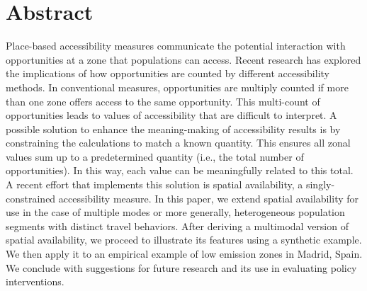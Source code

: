 \documentclass[10pt,letterpaper]{article}
\newcommand{\getIndex}[2]{
  \ForEach{,}{\IfEq{#1}{\thislevelitem}{\number\thislevelcount\ExitForEach}{}}{#2}
}
\newcommand{\getAff}[1]{
  \getIndex{#1}{McMaster,Madrid}
}
\begin{document}
\vspace*{0.2in}


\section*{Abstract}
Place-based accessibility measures communicate the potential interaction
with opportunities at a zone that populations can access. Recent
research has explored the implications of how opportunities are counted
by different accessibility methods. In conventional measures,
opportunities are multiply counted if more than one zone offers access
to the same opportunity. This multi-count of opportunities leads to
values of accessibility that are difficult to interpret. A possible
solution to enhance the meaning-making of accessibility results is by
constraining the calculations to match a known quantity. This ensures
all zonal values sum up to a predetermined quantity (i.e., the total
number of opportunities). In this way, each value can be meaningfully
related to this total. A recent effort that implements this solution is
spatial availability, a singly-constrained accessibility measure. In
this paper, we extend spatial availability for use in the case of
multiple modes or more generally, heterogeneous population segments with
distinct travel behaviors. After deriving a multimodal version of
spatial availability, we proceed to illustrate its features using a
synthetic example. We then apply it to an empirical example of low
emission zones in Madrid, Spain. We conclude with suggestions for future
research and its use in evaluating policy interventions.
\end{document}

